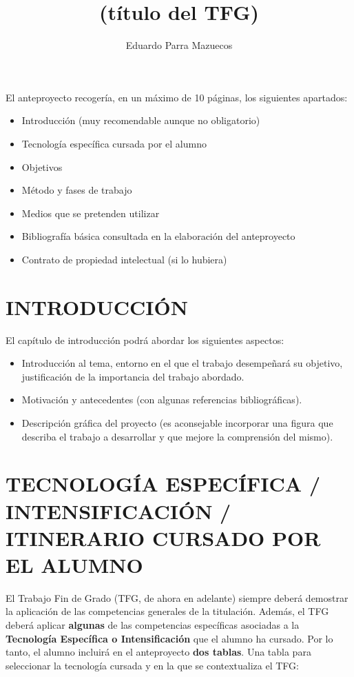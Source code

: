 \documentclass{pre-tfg}
\title{(título del TFG)}
\author{Eduardo Parra Mazuecos}
\begin{document}
\maketitle
\tableofcontents

\newpage

El anteproyecto recogería, en un \textcolor[rgb]{0.5,0.0,0.0}{máximo de 10 páginas},
los siguientes apartados:

\begin{itemize}
\item Introducción (muy recomendable aunque no obligatorio)
\item Tecnología específica cursada por el alumno
\item Objetivos
\item Método y fases de trabajo
\item Medios que se pretenden utilizar
\item Bibliografía básica consultada en la elaboración del anteproyecto
\item Contrato de propiedad intelectual (si lo hubiera)
\end{itemize}


\section{INTRODUCCIÓN}

El capítulo de introducción podrá abordar los siguientes aspectos:

\begin{itemize}
\item Introducción al tema, entorno en el que el trabajo desempeñará
  su objetivo, justificación de la importancia del trabajo abordado.
\item Motivación y antecedentes (con algunas referencias bibliográficas).
\item Descripción gráfica del proyecto (es aconsejable incorporar una figura que describa
  el trabajo a desarrollar y que mejore la comprensión del mismo).
\end{itemize}


\section{TECNOLOGÍA ESPECÍFICA / INTENSIFICACIÓN / ITINERARIO CURSADO POR EL ALUMNO}

El Trabajo Fin de Grado (TFG, de ahora en adelante) siempre deberá demostrar la aplicación
de las competencias generales de la titulación. Además, el TFG deberá aplicar
\textbf{algunas} de las competencias específicas asociadas a la \textbf{Tecnología
  Específica o Intensificación} que el alumno ha cursado. Por lo tanto, el alumno incluirá
en el anteproyecto \textbf{dos tablas}. Una tabla para seleccionar la tecnología cursada y
en la que se contextualiza el TFG:
\end{document}
